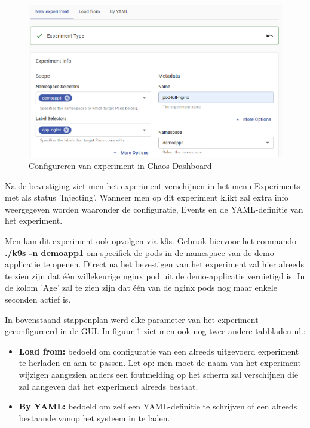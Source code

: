 \begin{figure}[h]
    \centering
    \includegraphics[scale=.7]{img/experiment-info.png}
    \caption{Configureren van experiment in Chaos Dashboard}
    \label{img:config-in-dashboard}
\end{figure}

Na de bevestiging ziet men het experiment verschijnen in het menu Experiments met als status 'Injecting'. Wanneer men op dit experiment klikt zal extra info weergegeven worden waaronder de configuratie, Events en de YAML-definitie van het experiment. 

Men kan dit experiment ook opvolgen via k9s. Gebruik hiervoor het commando {\bf ./k9s -n demoapp1} om specifiek de pods in de namespace van de demo-applicatie te openen. Direct na het bevestigen van het experiment zal hier alreeds te zien zijn dat één willekeurige nginx pod uit de demo-applicatie vernietigd is.
In de kolom 'Age' zal te zien zijn dat één van de nginx pods nog maar enkele seconden actief is. 

In bovenstaand stappenplan werd elke parameter van het experiment geconfigureerd in de GUI. In figuur \ref{img:config-in-dashboard} ziet men ook nog twee andere tabbladen nl.:
\begin{itemize}
    \item {\bf Load from:} bedoeld om configuratie van een alreeds uitgevoerd experiment te herladen en aan te passen. Let op: men moet de naam van het experiment wijzigen aangezien anders een foutmelding op het scherm zal verschijnen die zal aangeven dat het experiment alreeds bestaat.
    \item {\bf By YAML:} bedoeld om zelf een YAML-definitie te schrijven of een alreeds bestaande vanop het systeem in te laden.
\end{itemize} 

